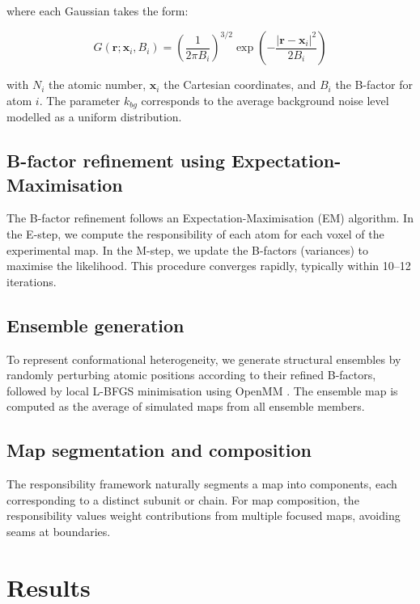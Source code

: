 \documentclass[11pt]{article}
\begin{document}
\noindent where each Gaussian takes the form:

\begin{equation}
G(\mathbf{r}; \mathbf{x}_i, B_i) = \left(\frac{1}{2\pi B_i}\right)^{3/2} \exp\left(-\frac{|\mathbf{r} - \mathbf{x}_i|^2}{2B_i}\right)
\end{equation}

\noindent with $N_i$ the atomic number, $\mathbf{x}_i$ the Cartesian coordinates, and $B_i$ the B-factor for atom $i$. The parameter $k_{bg}$ corresponds to the average background noise level modelled as a uniform distribution.

\subsection{B-factor refinement using Expectation-Maximisation}

The B-factor refinement follows an Expectation-Maximisation (EM) algorithm. In the E-step, we compute the responsibility of each atom for each voxel of the experimental map. In the M-step, we update the B-factors (variances) to maximise the likelihood. This procedure converges rapidly, typically within 10--12 iterations.

\subsection{Ensemble generation}

To represent conformational heterogeneity, we generate structural ensembles by randomly perturbing atomic positions according to their refined B-factors, followed by local L-BFGS minimisation \citep{nocedal1980} using OpenMM \citep{eastman2017}. The ensemble map is computed as the average of simulated maps from all ensemble members.

\subsection{Map segmentation and composition}

The responsibility framework naturally segments a map into components, each corresponding to a distinct subunit or chain. For map composition, the responsibility values weight contributions from multiple focused maps, avoiding seams at boundaries.

\section{Results}
\end{document}
